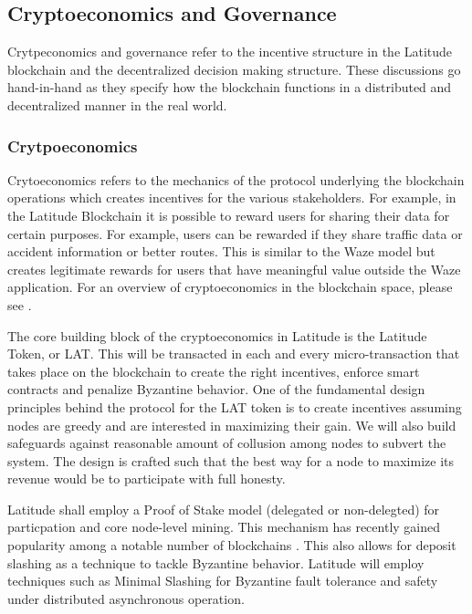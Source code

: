 \noindent
\subsection{Cryptoeconomics and Governance}

Crytpeconomics and governance refer to the incentive structure in the Latitude blockchain and the decentralized decision
making structure. These discussions go hand-in-hand as they specify how the blockchain functions in a distributed and
decentralized manner in the real world.

\subsubsection{Crytpoeconomics}
Crytoeconomics refers to the mechanics of the protocol underlying the blockchain operations which creates incentives
for the various stakeholders. For example, in the Latitude Blockchain it is possible to reward users for sharing their data
for certain purposes. For example, users can be rewarded if they share traffic data or accident information or better
routes. This is similar to the Waze model but creates legitimate rewards for users that have meaningful value outside
the Waze application. For an overview of cryptoeconomics in the blockchain space, please see \cite{sinclair_crypto}.

The core building block of the cryptoeconomics in Latitude is the Latitude Token, or LAT. This will be transacted in
each and every micro-transaction that takes place on the blockchain to create the right incentives, enforce smart
contracts and penalize Byzantine behavior. One of the fundamental design principles behind the protocol for the LAT
token is to create incentives assuming nodes are greedy and are interested in maximizing their gain. We will also build
safeguards against reasonable amount of collusion among nodes to subvert the system. The design is crafted such that the
best way for a node to maximize its revenue would be to participate with full honesty.

Latitude shall employ a Proof of Stake model (delegated or non-delegted) for particpation and core node-level mining. This mechanism has recently
gained popularity among a notable number of blockchains \cite{dpos_steemit}. This also allows for deposit slashing as a
technique to tackle Byzantine behavior. Latitude will employ techniques such as Minimal Slashing \cite{buterin_slashing}
for Byzantine fault tolerance and safety under distributed asynchronous operation.

